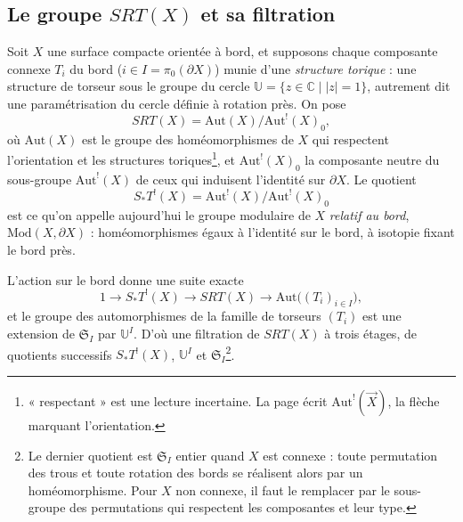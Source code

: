 \documentclass[11pt,a4paper]{article}
\begin{document}
\subsection*{Le groupe $SRT(X)$ et sa filtration}

Soit $X$ une surface compacte orientée à bord, et supposons chaque composante
connexe $T_i$ du bord ($i \in I = \pi_0(\partial X)$) munie d'une
\emph{structure torique} : une structure de torseur sous le groupe du cercle
$\mathbb{U} = \{ z \in \mathbb{C} \mid |z| = 1 \}$, autrement dit une
paramétrisation du cercle définie à rotation près. On pose
\[
SRT(X) = \mathrm{Aut}(X)/\mathrm{Aut}^{!}(X)_0 ,
\]
où $\mathrm{Aut}(X)$ est le groupe des homéomorphismes de $X$ qui respectent
l'orientation et les structures toriques\footnote{« respectant » est une
lecture incertaine. La page écrit $\mathrm{Aut}^{!}(\vec{X})$, la flèche
marquant l'orientation.}, et $\mathrm{Aut}^{!}(X)_0$ la composante neutre du
sous-groupe $\mathrm{Aut}^{!}(X)$ de ceux qui induisent l'identité sur
$\partial X$. Le quotient
\[
S_{*}T^{!}(X) = \mathrm{Aut}^{!}(X)/\mathrm{Aut}^{!}(X)_0
\]
est ce qu'on appelle aujourd'hui le groupe modulaire de $X$ \emph{relatif au
bord}, $\mathrm{Mod}(X, \partial X)$ : homéomorphismes égaux à l'identité sur
le bord, à isotopie fixant le bord près.

L'action sur le bord donne une suite exacte
\[
1 \to S_{*}T^{!}(X) \to SRT(X) \to \mathrm{Aut}\bigl((T_i)_{i \in I}\bigr),
\]
et le groupe des automorphismes de la famille de torseurs
$(T_i)$ est une extension de $\mathfrak{S}_I$ par $\mathbb{U}^{I}$. D'où une
filtration de $SRT(X)$ à trois étages, de quotients successifs
$S_{*}T^{!}(X)$, $\mathbb{U}^{I}$ et $\mathfrak{S}_I$\footnote{Le dernier
quotient est $\mathfrak{S}_I$ entier quand $X$ est connexe : toute permutation
des trous et toute rotation des bords se réalisent alors par un homéomorphisme.
Pour $X$ non connexe, il faut le remplacer par le sous-groupe des permutations
qui respectent les composantes et leur type.}.
\end{document}
